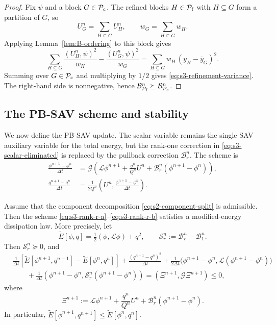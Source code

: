 \documentclass[10pt,onefignum,onetabnum,hidelinks]{siamart251216}
\begin{document}
\begin{proof}
Fix \(\psi\) and a block \(G\in\mathcal P_{\rm c}\). The refined blocks
\(H\in\mathcal P_{\rm f}\) with \(H\subseteq G\) form a partition of \(G\), so
\[
U_G^n=\sum_{H\subseteq G}U_H^n,
\qquad
w_G=\sum_{H\subseteq G}w_H .
\]
Applying Lemma~\ref{lem:B-ordering} to this block gives
\[
\sum_{H\subseteq G}\frac{(U_H^n,\psi)^2}{w_H}
-
\frac{(U_G^n,\psi)^2}{w_G}
=
\sum_{H\subseteq G}w_H\,(y_H-\bar y_G)^2 .
\]
Summing over \(G\in\mathcal P_{\rm c}\) and multiplying by \(1/2\) gives
\eqref{eq:s3-refinement-variance}. The right-hand side is nonnegative, hence
\(\mathcal B_{\mathcal P_{\rm f}}^n
\succeq
\mathcal B_{\mathcal P_{\rm c}}^n\).
\end{proof}

\subsection{The PB-SAV scheme and stability}
\label{subsec:rank-r-first-order}

We now define the PB-SAV update.  The scalar variable remains the single SAV auxiliary variable for the total energy, but the rank-one correction in \eqref{eq:s3-scalar-eliminated} is replaced by the pullback correction $\mathcal B_r^n$.  The scheme is
\begin{align}
\frac{\phi^{n+1}-\phi^n}{\Delta t}
&=
\mathcal G\left(
\mathcal L\phi^{n+1}
+
\frac{q^n}{Q^n}U^n
+
\mathcal B_r^n(\phi^{n+1}-\phi^n)
\right),
\label{eq:s3-rank-r-a}
\\
\frac{q^{n+1}-q^n}{\Delta t}
&=
\frac{1}{2Q^n}
\left(
U^n,\frac{\phi^{n+1}-\phi^n}{\Delta t}
\right).
\label{eq:s3-rank-r-b}
\end{align}
\begin{theorem}
\label{thm:rank-r-stability}
Assume that the component decomposition
\eqref{eq:s2-component-split} is admissible. Then the scheme
\eqref{eq:s3-rank-r-a}--\eqref{eq:s3-rank-r-b} satisfies a modified-energy
dissipation law. More precisely, let
\[
\widetilde E[\phi,q]=\tfrac12(\phi,\mathcal L\phi)+q^2,
\qquad
\mathcal S_r^n:=\mathcal B_r^n-\mathcal B_1^n.
\]
Then $\mathcal S_r^n\succeq0$, and
\begin{align}
&\frac{1}{\Delta t}
\left[
\widetilde E[\phi^{n+1},q^{n+1}]
-
\widetilde E[\phi^n,q^n]
\right]
+
\frac{(q^{n+1}-q^n)^2}{\Delta t}
+
\frac{1}{2\Delta t}\bigl(\phi^{n+1}-\phi^n,\mathcal L(\phi^{n+1}-\phi^n)\bigr)
\nonumber\\
&\qquad
+
\frac{1}{\Delta t}
\left(
\phi^{n+1}-\phi^n,\mathcal S_r^n(\phi^{n+1}-\phi^n)
\right)
=
\left(
\Xi^{n+1},
\mathcal G\Xi^{n+1}
\right)
\le0,
\label{eq:s3-rank-r-energy-law}
\end{align}
where
\[
\Xi^{n+1}
:=
\mathcal L\phi^{n+1}
+
\frac{q^n}{Q^n}U^n
+
\mathcal B_r^n(\phi^{n+1}-\phi^n).
\]
In particular, $\widetilde E[\phi^{n+1},q^{n+1}]
\le \widetilde E[\phi^n,q^n]$.
\end{theorem}
\end{document}
